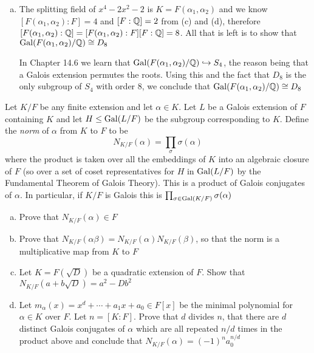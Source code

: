 \begin{solution}
\begin{enumerate}[(a)]
        \item The splitting field of $x^4 - 2x^2 - 2$ is $K = F(\alpha_1, \alpha_2)$ and we know $[F(\alpha_1, \alpha_2):F] = 4$ and $[F:\mathbb{Q}] = 2$ from (c) and (d), therefore $[F(\alpha_1, \alpha_2):\mathbb{Q}] = [F(\alpha_1, \alpha_2):F][F:\mathbb{Q}] = 8$. All that is left is to show that $\operatorname{Gal}(F(\alpha_1, \alpha_2)/\mathbb{Q}) \cong D_8$
        
        \noindent In Chapter 14.6 we learn that $\operatorname{Gal}(F(\alpha_1, \alpha_2)/\mathbb{Q}) \hookrightarrow S_4$, the reason being that a Galois extension permutes the roots. Using this and the fact that $D_8$ is the only subgroup of $S_4$ with order 8, we conclude that $\operatorname{Gal}(F(\alpha_1, \alpha_2)/\mathbb{Q}) \cong D_8$
    \end{enumerate}
\end{solution}

\begin{exercise}
    Let $K/F$ be any finite extension and let $\alpha \in K$. Let $L$ be a Galois extension of $F$ containing $K$ and let $H \leq \operatorname{Gal}(L/F)$ be the subgroup corresponding to $K$. Define the \textit{norm} of $\alpha$ from $K$ to $F$ to be 
    \[N_{K/F}(\alpha) = \prod_{\sigma} \sigma(\alpha)\]
    where the product is taken over all the embeddings of $K$ into an algebraic closure of $F$ (so over a set of coset representatives for $H$ in $\operatorname{Gal}(L/F)$ by the Fundamental Theorem of Galois Theory). This is a product of Galois conjugates of $\alpha$. In particular, if $K/F$ is Galois this is $\prod_{\sigma \in \operatorname{Gal}(K/F)} \sigma(\alpha)$ 
    \begin{enumerate}[(a)]
        \item Prove that $N_{K/F}(\alpha) \in F$

        \item Prove that $N_{K/F}(\alpha\beta) = N_{K/F}(\alpha)N_{K/F}(\beta)$, so that the norm is a multiplicative map from $K$ to $F$

        \item Let $K = F(\sqrt{D})$ be a quadratic extension of $F$. Show that $N_{K/F}(a + b\sqrt{D}) = a^2 - Db^2$

        \item Let $m_{\alpha}(x) = x^d + \cdots + a_1x + a_0 \in F[x]$ be the minimal polynomial for $\alpha \in K$ over $F$. Let $n = [K:F]$. Prove that $d$ divides $n$, that there are $d$ distinct Galois conjugates of $\alpha$ which are all repeated $n/d$ times in the product above and conclude that $N_{K/F}(\alpha) = (-1)^na_0^{n/d}$
    \end{enumerate}
\end{exercise}
